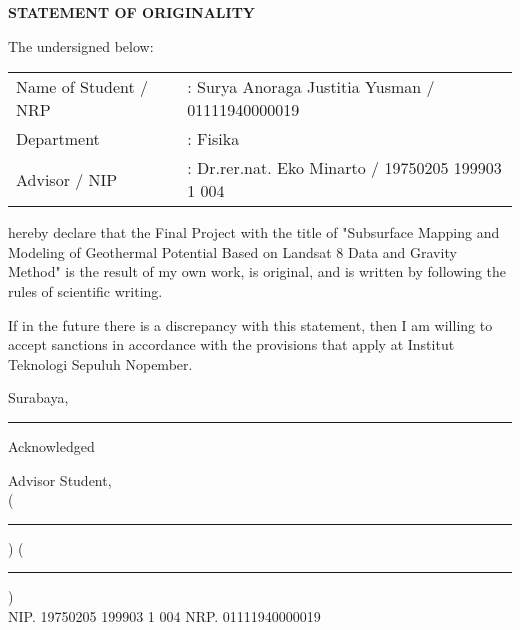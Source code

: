\newpage
\begin{center}
    \textbf{STATEMENT OF ORIGINALITY}
\end{center}

\vskip20pt
The undersigned below:
\vskip15pt

\begin{tabular}[h]{ll}
    Name of Student / NRP &: Surya Anoraga Justitia Yusman / 01111940000019\\
    Department &: Fisika\\
    Advisor / NIP &: Dr.rer.nat. Eko Minarto / 19750205 199903 1 004\\
\end{tabular}

\vskip20pt

hereby declare that the Final Project with the title of "Subsurface Mapping and Modeling of Geothermal Potential Based on Landsat 8 Data and Gravity Method" is the result of my own work, is original, and is written by following the rules of scientific writing.

If in the future there is a discrepancy with this statement, then I am willing to accept sanctions 
in accordance with the provisions that apply at Institut Teknologi Sepuluh Nopember.

\hfill Surabaya,\rule{3cm}{0.2pt}

Acknowledged
\vskip 3pt

Advisor \hspace{7.1cm} Student,\\
\vskip2cm
(\rule{5cm}{0.2pt}) \hspace{3.2cm} (\rule{5cm}{0.2pt}) \\
NIP. 19750205 199903 1 004 \hspace{3.5cm} NRP. 01111940000019\\
\restoregeometry